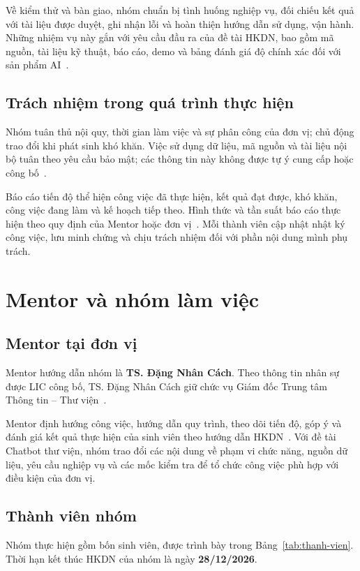 Về kiểm thử và bàn giao, nhóm chuẩn bị tình huống nghiệp vụ, đối chiếu kết quả với tài liệu được duyệt, ghi nhận lỗi và hoàn thiện hướng dẫn sử dụng, vận hành. Những nhiệm vụ này gắn với yêu cầu đầu ra của đề tài HKDN, bao gồm mã nguồn, tài liệu kỹ thuật, báo cáo, demo và bảng đánh giá độ chính xác đối với sản phẩm AI~\cite{hkdn-de-tai}.

\subsection{Trách nhiệm trong quá trình thực hiện}
Nhóm tuân thủ nội quy, thời gian làm việc và sự phân công của đơn vị; chủ động trao đổi khi phát sinh khó khăn. Việc sử dụng dữ liệu, mã nguồn và tài liệu nội bộ tuân theo yêu cầu bảo mật; các thông tin này không được tự ý cung cấp hoặc công bố~\cite{hkdn-huong-dan}.

Báo cáo tiến độ thể hiện công việc đã thực hiện, kết quả đạt được, khó khăn, công việc đang làm và kế hoạch tiếp theo. Hình thức và tần suất báo cáo thực hiện theo quy định của Mentor hoặc đơn vị~\cite{hkdn-huong-dan}. Mỗi thành viên cập nhật nhật ký công việc, lưu minh chứng và chịu trách nhiệm đối với phần nội dung mình phụ trách.

\section{Mentor và nhóm làm việc}

\subsection{Mentor tại đơn vị}
Mentor hướng dẫn nhóm là \textbf{TS. Đặng Nhân Cách}. Theo thông tin nhân sự được LIC công bố, TS. Đặng Nhân Cách giữ chức vụ Giám đốc Trung tâm Thông tin -- Thư viện~\cite{lic-gioi-thieu}.

Mentor định hướng công việc, hướng dẫn quy trình, theo dõi tiến độ, góp ý và đánh giá kết quả thực hiện của sinh viên theo hướng dẫn HKDN~\cite{hkdn-huong-dan}. Với đề tài Chatbot thư viện, nhóm trao đổi các nội dung về phạm vi chức năng, nguồn dữ liệu, yêu cầu nghiệp vụ và các mốc kiểm tra để tổ chức công việc phù hợp với điều kiện của đơn vị.

\subsection{Thành viên nhóm}
Nhóm thực hiện gồm bốn sinh viên, được trình bày trong Bảng~\ref{tab:thanh-vien}. Thời hạn kết thúc HKDN của nhóm là ngày \textbf{28/12/2026}.


